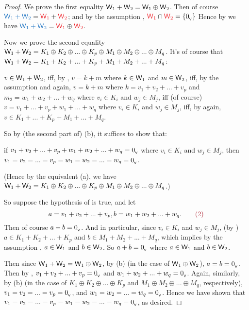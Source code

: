 \begin{note}
\end{note}

\begin{proof}
We prove the first equality \(\textsf{W}_1 + \textsf{W}_2 = \textsf{W}_1 \oplus \textsf{W}_2\).
Then of course \(\BLUE{\W_1 + \W_2} = \RED{\W_1} + \RED{\W_2}\);
and by the assumption , \(\RED{\W_1} \cap \RED{\W_2} = \{ \OV \}\)
Hence by  we have \(\BLUE{\W_1 + \W_2} = \RED{\W_1} \oplus \RED{\W_2}\).

Now we prove the second equality \(\textsf{W}_1 + \textsf{W}_2 = K_1 \oplus K_2 \oplus ... \oplus K_p \oplus M_1 \oplus M_2 \oplus ... \oplus M_q\).
It's of course that \(\textsf{W}_1 + \textsf{W}_2 = K_1 + K_2 + ... + K_p + M_1 + M_2 + ... + M_q\):

\(v \in \textsf{W}_1 + \textsf{W}_2\),
iff, by , \(v = k + m\) where \(k \in \textsf{W}_1\) and \(m \in \textsf{W}_2\),
iff, by the assumption  and  again, \(v = k + m\) where \(k = v_1 + v_2 + ... + v_p\) and \(m_2 = w_1 + w_2 + ... + w_q\) where \(v_i \in K_i\) and \(w_j \in M_j\),
iff (of course) \(v = v_1 + ... + v_p + w_1 + ... + w_q\) where \(v_i \in K_i\) and \(w_j \in M_j\),
iff, by  again, \(v \in K_1 + ... + K_p + M_1 + ... + M_q\).

So by (the second part of) (b), it suffices to show that:
\begin{center}
    if \(v_1 + v_2 + ... + v_p + w_1 + w_2 + ... + w_q = 0_{_{\textsf{V}}}\) where \(v_i \in K_i\) and \(w_j \in M_j\), then \(v_1 = v_2 = ... = v_p = w_1 = w_2 = ... = w_q = 0_{_{\textsf{V}}}\). \quad \quad {}
\end{center}
(Hence by the equivalent (a), we have \(\textsf{W}_1 + \textsf{W}_2 = K_1 \oplus K_2 \oplus ... \oplus K_p \oplus M_1 \oplus M_2 \oplus ... \oplus M_q\).)

So suppose the hypothesis of  is true, and let
\[
    a = v_1 + v_2 + ... + v_p, b = w_1 + w_2 + ... + w_q. \quad \quad \MAROON{(2)}
\]
Then of course \(a + b = 0_{_{\textsf{V}}}\).
And in particular, since \(v_i \in K_i\) and \(w_j \in M_j\), (by ) \(a \in K_1 + K_2 + ... + K_p\) and \(b \in M_1 + M_2 + ... + M_q\),
which implies by the assumption , \(a \in \textsf{W}_1\) and \(b \in \textsf{W}_2\).
So \(a + b = 0_{_{\textsf{V}}}\) where \(a \in \textsf{W}_1\) and \(b \in \textsf{W}_2\).

Then since \(\textsf{W}_1 + \textsf{W}_2 = \textsf{W}_1 \oplus \textsf{W}_2\), by (b) (in the case of \(\textsf{W}_1 \oplus \textsf{W}_2\)), \(a = b = 0_{_{\textsf{V}}}\).
Then by , \(v_1 + v_2 + ... + v_p = 0_{_{\textsf{V}}}\) and \(w_1 + w_2 + ... + w_q = 0_{_{\textsf{V}}}\).
Again, similarly, by (b) (in the case of \(K_1 \oplus K_2 \oplus ... \oplus K_p\) and \(M_1 \oplus M_2 \oplus ... \oplus M_q\), respectively), \(v_1 = v_2 = ... = v_p = 0_{_{\textsf{V}}}\), and \(w_1 = w_2 = ... = w_q = 0_{_{\textsf{V}}}\).
Hence we have shown that \(v_1 = v_2 = ... = v_p = w_1 = w_2 = ... = w_q = 0_{_{\textsf{V}}}\), as desired.
\end{proof}
